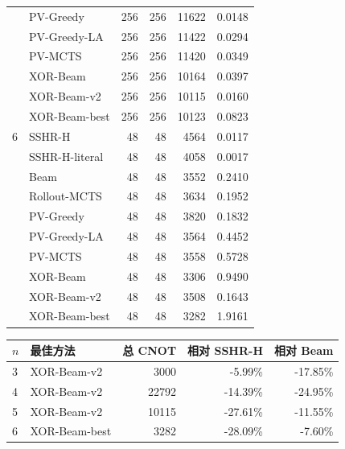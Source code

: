 \begin{center}
\begin{longtable}{llrrrr}
 & PV-Greedy & 256 & 256 & 11622 & 0.0148 \\
 & PV-Greedy-LA & 256 & 256 & 11422 & 0.0294 \\
 & PV-MCTS & 256 & 256 & 11420 & 0.0349 \\
 & XOR-Beam & 256 & 256 & 10164 & 0.0397 \\
 & XOR-Beam-v2 & 256 & 256 & 10115 & 0.0160 \\
 & XOR-Beam-best & 256 & 256 & 10123 & 0.0823 \\
\midrule
6 & SSHR-H & 48 & 48 & 4564 & 0.0117 \\
 & SSHR-H-literal & 48 & 48 & 4058 & 0.0017 \\
 & Beam & 48 & 48 & 3552 & 0.2410 \\
 & Rollout-MCTS & 48 & 48 & 3634 & 0.1952 \\
 & PV-Greedy & 48 & 48 & 3820 & 0.1832 \\
 & PV-Greedy-LA & 48 & 48 & 3564 & 0.4452 \\
 & PV-MCTS & 48 & 48 & 3558 & 0.5728 \\
 & XOR-Beam & 48 & 48 & 3306 & 0.9490 \\
 & XOR-Beam-v2 & 48 & 48 & 3508 & 0.1643 \\
 & XOR-Beam-best & 48 & 48 & 3282 & 1.9161 \\
\bottomrule
\end{longtable}
\end{center}

\begin{center}
\small
{}
\label{tab:improvements}
\begin{tabular}{llrrr}
\toprule
$n$ & 最佳方法 & 总 CNOT & 相对 SSHR-H & 相对 Beam \\
\midrule
3 & XOR-Beam-v2 & 3000 & -5.99\% & -17.85\% \\
4 & XOR-Beam-v2 & 22792 & -14.39\% & -24.95\% \\
5 & XOR-Beam-v2 & 10115 & -27.61\% & -11.55\% \\
6 & XOR-Beam-best & 3282 & -28.09\% & -7.60\% \\
\bottomrule
\end{tabular}
\end{center}
